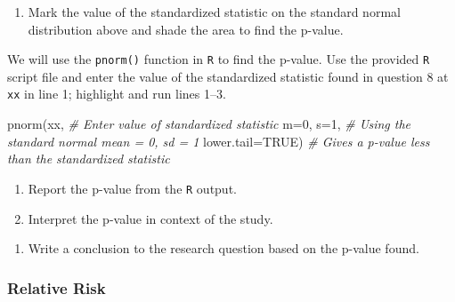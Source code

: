 \documentclass[
]{report}
\newenvironment{Shaded}{\begin{snugshade}}{\end{snugshade}}
\newcommand{\AttributeTok}[1]{\textcolor[rgb]{0.77,0.63,0.00}{#1}}
\newcommand{\CommentTok}[1]{\textcolor[rgb]{0.56,0.35,0.01}{\textit{#1}}}
\newcommand{\ConstantTok}[1]{\textcolor[rgb]{0.00,0.00,0.00}{#1}}
\newcommand{\DecValTok}[1]{\textcolor[rgb]{0.00,0.00,0.81}{#1}}
\newcommand{\FunctionTok}[1]{\textcolor[rgb]{0.00,0.00,0.00}{#1}}
\newcommand{\NormalTok}[1]{#1}
\providecommand{\tightlist}{%
  \setlength{\itemsep}{0pt}\setlength{\parskip}{0pt}}
\begin{document}
\begin{enumerate}
\def\labelenumi{\arabic{enumi}.}
\setcounter{enumi}{9}
\tightlist
\item
  Mark the value of the standardized statistic on the standard normal distribution above and shade the area to find the p-value.
\end{enumerate}

\vspace{0.1in}

We will use the \texttt{pnorm()} function in \texttt{R} to find the p-value. Use the provided \texttt{R} script file and enter the value of the standardized statistic found in question 8 at \texttt{xx} in line 1; highlight and run lines 1--3.

\begin{Shaded}
\begin{Highlighting}[]
\FunctionTok{pnorm}\NormalTok{(xx, }\CommentTok{\# Enter value of standardized statistic}
      \AttributeTok{m=}\DecValTok{0}\NormalTok{, }\AttributeTok{s=}\DecValTok{1}\NormalTok{, }\CommentTok{\# Using the standard normal mean = 0, sd = 1}
      \AttributeTok{lower.tail=}\ConstantTok{TRUE}\NormalTok{) }\CommentTok{\# Gives a p{-}value less than the standardized statistic}
\end{Highlighting}
\end{Shaded}

\begin{enumerate}
\def\labelenumi{\arabic{enumi}.}
\setcounter{enumi}{10}
\item
  Report the p-value from the \texttt{R} output.
  \vspace{0.2in}
\item
  Interpret the p-value in context of the study.
\end{enumerate}

\vspace{0.5in}

\begin{enumerate}
\def\labelenumi{\arabic{enumi}.}
\setcounter{enumi}{12}
\tightlist
\item
  Write a conclusion to the research question based on the p-value found.
\end{enumerate}

\vspace{1in}

\newpage

\hypertarget{relative-risk}{%
\subsubsection*{Relative Risk}\label{relative-risk}}
\end{document}
